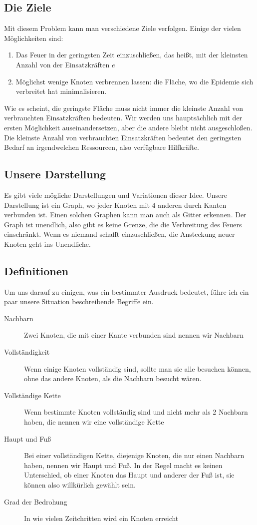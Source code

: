 \documentclass{article}
\begin{document}
\subsection{Die Ziele}
Mit diesem Problem kann man verschiedene Ziele verfolgen. Einige der vielen Möglichkeiten sind:
\begin{enumerate}
\item Das Feuer in der geringsten Zeit einzuschließen, das heißt, mit der kleinsten Anzahl von der Einsatzkräften $e$
\item Möglichst wenige Knoten verbrennen lassen: die Fläche, wo die Epidemie sich verbreitet hat minimalisieren.
\end{enumerate}
Wie es scheint, die geringste Fläche muss nicht immer die kleinste Anzahl von verbrauchten Einsatzkräften bedeuten. Wir werden uns hauptsächlich mit der ersten Möglichkeit auseinandersetzen, aber die andere bleibt nicht ausgeschloßen. Die kleinste Anzahl von verbrauchten Einsatzkräften bedeutet den geringsten Bedarf an irgendwelchen Ressourcen, also verfügbare Hilfkräfte.

\subsection{Unsere Darstellung}
Es gibt viele mögliche Darstellungen und Variationen dieser Idee. Unsere Darstellung ist ein Graph, wo jeder Knoten mit 4 anderen durch Kanten verbunden ist. Einen solchen Graphen kann man auch als Gitter erkennen. Der Graph ist unendlich, also gibt es keine Grenze, die die Verbreitung des Feuers einschränkt. Wenn es niemand schafft einzuschließen, die Ansteckung neuer Knoten geht ins Unendliche.

\subsection{Definitionen}
Um uns darauf zu einigen, was ein bestimmter Ausdruck bedeutet, führe ich ein paar unsere Situation beschreibende Begriffe ein.
\begin{description}
\item[Nachbarn] Zwei Knoten, die mit einer Kante verbunden sind nennen wir Nachbarn
\item[Vollständigkeit] Wenn einige Knoten vollständig sind, sollte man sie alle besuchen können, ohne das andere Knoten, als die Nachbarn besucht wären.
\item[Vollständige Kette] Wenn bestimmte Knoten vollständig sind und nicht mehr als 2 Nachbarn haben, die nennen wir eine vollständige Kette
\item[Haupt und Fuß] Bei einer vollständigen Kette, diejenige Knoten, die nur einen Nachbarn haben, nennen wir Haupt und Fuß. In der Regel macht es keinen Unterschied, ob einer Knoten das Haupt und anderer der Fuß ist, sie können also willkürlich gewählt sein.
\item[Grad der Bedrohung] In wie vielen Zeitchritten wird ein Knoten erreicht
\end{description}
\end{document}
